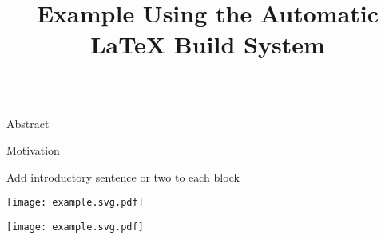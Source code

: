 \documentclass{cbxposter-ada}
\title   {Example Using the Automatic LaTeX Build System}
\renewcommand{\smallskip}{\vspace{0.16667in}}
\begin{document}
\begin{frame}[fragile,t]{}
\vspace{0.1in}
\begin{columns}[T]


\begin{column}{10.5in}
\vspace{0.4in}


\begin{block}{Abstract}
  \lipsum[1]
\end{block}


\vspace{0.67in}
\begin{block}{Motivation}
  \centering
  \smallskip

  Add introductory sentence or two to each block

  \begin{minipage}[t]{0.45\tw}
    \vspace{0pt}\centering


    \smallskip\smallskip
    \texttt{[image: example.svg.pdf]}

  \end{minipage}
  \hspace{0.2in}
  \begin{minipage}[t]{0.45\tw}
    \vspace{0pt}\centering


    \smallskip\smallskip
    \texttt{[image: example.svg.pdf]}

  \end{minipage}

  \smallskip\smallskip
\end{block}

\end{column}



\end{columns}
\end{frame}
\end{document}
